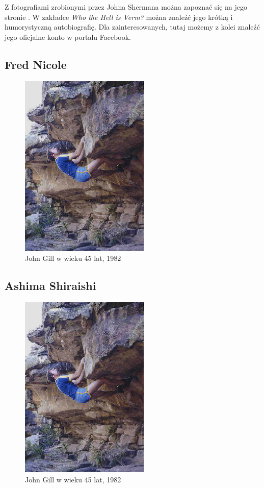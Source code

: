 \documentclass{article}
\begin{document}
Z fotografiami zrobionymi przez Johna Shermana można zapoznać się na jego stronie \cite{vermphoto}. W zakładce \textit{Who the Hell is Verm?} można znaleźć jego krótką i humorystyczną autobiografię. Dla zainteresowanych, tutaj \cite{vermfb} możemy z kolei znaleźć jego oficjalne konto w portalu Facebook. 

\subsection{Fred Nicole}

\begin{figure}[!htbp]
	\begin{center}
		\includegraphics[width=0.5\linewidth]{images/gill-2.eps}
	\end{center}
	\caption{John Gill w wieku 45 lat, 1982 \cite{gill-website}}
	\label{gill-1}
\end{figure}

\subsection{Ashima Shiraishi}

\begin{figure}[!htbp]
	\begin{center}
		\includegraphics[width=0.5\linewidth]{images/gill-2.eps}
	\end{center}
	\caption{John Gill w wieku 45 lat, 1982 \cite{gill-website}}
	\label{gill-1}
\end{figure}
\end{document}
